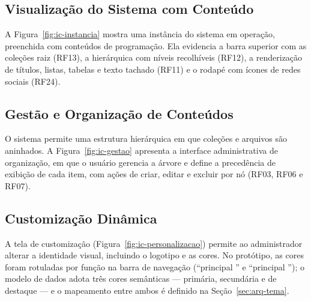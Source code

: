 \subsection{Visualização do Sistema com Conteúdo}

A Figura~\ref{fig:ic-instancia} mostra uma instância do sistema em operação, preenchida com conteúdos de programação. Ela evidencia a barra superior com as coleções raiz (RF13), a  hierárquica com níveis recolhíveis (RF12), a renderização de títulos, listas, tabelas e texto tachado (RF11) e o rodapé com ícones de redes sociais (RF24).


\subsection{Gestão e Organização de Conteúdos}

O sistema permite uma estrutura hierárquica em que coleções e arquivos são aninhados. A Figura~\ref{fig:ic-gestao} apresenta a interface administrativa de organização, em que o usuário gerencia a árvore e define a precedência de exibição de cada item, com ações de criar, editar e excluir por nó (RF03, RF06 e RF07).


\subsection{Customização Dinâmica}

A tela de customização (Figura~\ref{fig:ic-personalizacao}) permite ao administrador alterar a identidade visual, incluindo o logotipo e as cores. No protótipo, as cores foram rotuladas por função na barra de navegação (``principal '' e ``principal ''); o modelo de dados adota três cores semânticas --- primária, secundária e de destaque --- e o mapeamento entre ambos é definido na Seção~\ref{sec:arq-tema}.


